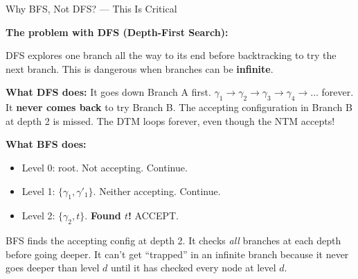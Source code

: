 \begin{conceptbox}{{Why BFS, Not DFS? --- This Is Critical}}

\textbf{The problem with DFS (Depth-First Search):}

DFS explores one branch all the way to its end before backtracking to try the
next branch. This is dangerous when branches can be \textbf{infinite}.

\begin{center}
\end{center}

\textbf{What DFS does:} It goes down Branch A first. $\gamma_1 \to \gamma_2
\to \gamma_3 \to \gamma_4 \to \ldots$ forever. It \textbf{never comes back} to
try Branch B. The accepting configuration in Branch B at depth 2 is missed.
The DTM loops forever, even though the NTM accepts!

\textbf{What BFS does:}
\begin{itemize}[nosep]
\item Level 0: root. Not accepting. Continue.
\item Level 1: $\{\gamma_1, \gamma'_1\}$. Neither accepting. Continue.
\item Level 2: $\{\gamma_2, t\}$. \textbf{Found $t$!} ACCEPT.
\end{itemize}

BFS finds the accepting config at depth 2. It checks \emph{all} branches at
each depth before going deeper. It can't get ``trapped'' in an infinite branch
because it never goes deeper than level $d$ until it has checked every node at
level $d$.


\end{conceptbox}
